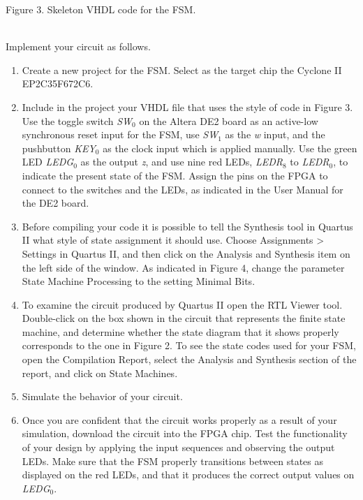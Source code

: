 \documentclass[epsfig,10pt,fullpage]{article}
\begin{document}
\begin{center}
Figure 3. Skeleton VHDL code for the FSM.
\end{center}
~\\
Implement your circuit as follows.

\begin{enumerate}
\item Create a new project for the FSM. Select as the target chip the 
Cyclone II EP2C35F672C6.

\item Include in the project your VHDL file that uses the style of code in Figure 3.
Use the toggle switch {\it SW}$_0$ on the Altera DE2 board as an active-low synchronous reset input
for the FSM, use {\it SW}$_1$ as the {\it w} input, and the pushbutton {\it KEY}$_0$ as the clock input which 
is applied manually.  Use the green LED {\it LEDG}$_0$ as the output {\it z}, 
and use nine red LEDs, {\it LEDR}$_8$ to {\it LEDR}$_0$, to indicate the present state of the FSM.
Assign the pins on the FPGA to 
connect to the switches and the LEDs, as indicated in the User Manual for the DE2 board.

\item Before compiling your code it is possible to tell the Synthesis tool in
Quartus II what style of state assignment it should use. Choose {\sf Assignments > Settings}
in Quartus II, and then click on the {\sf Analysis and Synthesis} item on the left side of 
the window. As indicated in Figure 4, change the parameter {\sf State Machine Processing} 
to the setting {\sf Minimal Bits}.

\item To examine the circuit produced by Quartus II open the RTL Viewer tool. Double-click
on the box shown in the circuit that represents the finite state machine, and determine
whether the state diagram that it shows properly corresponds to the one in Figure 2.
To see the state codes used for your FSM, open the Compilation Report, select the {\sf Analysis
and Synthesis} section of the report, and click on {\sf State Machines}.

\item Simulate the behavior of your circuit.

\item Once you are confident that the circuit works properly as a result of your
simulation, download the circuit into the FPGA chip.  Test the functionality of your 
design by applying the input sequences and observing the output LEDs. Make sure that the
FSM properly transitions between states as displayed on the red LEDs, and that it produces
the correct output values on {\it LEDG}$_0$.


\end{enumerate}
\end{document}
